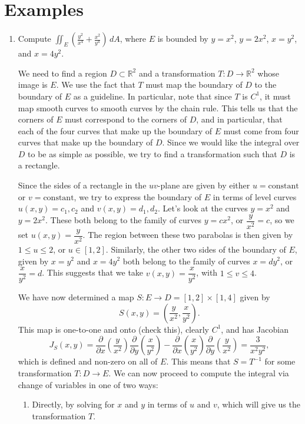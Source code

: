 \documentclass[12pt,letterpaper]{article}
\newcommand{\R}{\mathbb{R}}
\newcommand{\di}{\displaystyle}
\begin{document}
\section{Examples}
\begin{enumerate}
\item Compute $\di \iint_E \left(\frac{y^2}{x^4}+\frac{x^2}{y^4}\right)\,dA$, where $E$ is bounded by $y=x^2$, $y=2x^2$, $x=y^2$, and $x=4y^2$.

\bigskip

 We need to find a region $D\subset \R^2$ and a transformation $T:D\to \R^2$ whose image is $E$. We use the fact that $T$ must map the boundary of $D$ to the boundary of $E$ as a guideline. In particular, note that since $T$ is $C^1$, it must map smooth curves to smooth curves by the chain rule. This tells us that the corners of $E$ must correspond to the corners of $D$, and in particular, that each of the four curves that make up the boundary of $E$ must come from four curves that make up the boundary of $D$. Since we would like the integral over $D$ to be as simple as possible, we try to find a transformation such that $D$ is a rectangle.

Since the sides of a rectangle in the $uv$-plane are given by either $u=\text{constant}$ or $v=\text{constant}$, we try to express the boundary of $E$ in terms of level curves $u(x,y)=c_1, c_2$ and $v(x,y)=d_1,d_2$. Let's look at the curves $y=x^2$ and $y=2x^2$. These both belong to the family of curves $y=cx^2$, or $\dfrac{y}{x^2}=c$, so we set $u(x,y) = \dfrac{y}{x^2}$. The region between these two parabolas is then given by $1\leq u\leq 2$, or $u\in [1,2]$. Similarly, the other two sides of the boundary of $E$, given by $x=y^2$ and $x=4y^2$ both belong to the family of curves $x=dy^2$, or $\dfrac{x}{y^2}=d$. This suggests that we take $v(x,y)=\dfrac{x}{y^2}$, with $1\leq v\leq 4$.

We have now determined a map $S:E\to D=[1,2]\times [1,4]$ given by
\[
S(x,y) = \left(\frac{y}{x^2}, \frac{x}{y^2}\right).
\]
This map is one-to-one and onto (check this), clearly $C^1$, and has Jacobian
\[
J_S(x,y) = \frac{\partial}{\partial x}\left(\frac{y}{x^2}\right)\frac{\partial}{\partial y}\left(\frac{x}{y^2}\right)-\frac{\partial}{\partial x}\left(\frac{x}{y^2}\right)\frac{\partial}{\partial y}\left(\frac{y}{x^2}\right)=\frac{3}{x^2y^2},
\]
which is defined and non-zero on all of $E$. This means that $S=T^{-1}$ for some transformation $T:D\to E$. We can now proceed to compute the integral via change of variables in one of two ways:
\begin{enumerate}
\item Directly, by solving for $x$ and $y$ in terms of $u$ and $v$, which will give us the transformation $T$.


\end{enumerate}
\end{enumerate}
\end{document}
